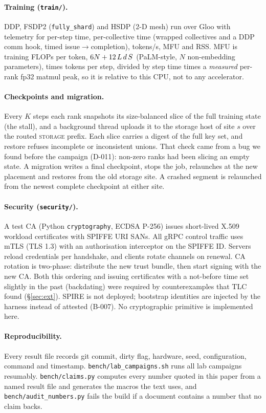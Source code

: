 \paragraph{Training (\texttt{train/}).}
DDP, FSDP2 (\texttt{fully\_shard}) and HSDP (2-D mesh) run over Gloo with telemetry for per-step time,
per-collective time (wrapped collectives and a DDP comm hook, timed issue$\to$completion), tokens/s, MFU and
RSS. MFU is training FLOPs per token, $6N + 12\,L\,d\,S$ (PaLM-style, $N$ non-embedding parameters), times tokens
per step, divided by step time times a \emph{measured} per-rank fp32 matmul peak, so it is relative to this CPU, not to
any accelerator.

\paragraph{Checkpoints and migration.}
Every $K$ steps each rank snapshots its size-balanced slice of the full training state (the stall), and a
background thread uploads it to the storage host of site $s$ over the routed \textsc{storage} prefix.
Each slice carries a digest of the full key set, and restore refuses incomplete or inconsistent unions.
That check came from a bug we found before the campaign (D-011): non-zero ranks had been slicing an
empty state. A migration writes a final checkpoint, stops the job, relaunches at the new placement and
restores from the old storage site. A crashed segment is relaunched from the newest complete checkpoint
at either site.

\paragraph{Security (\texttt{security/}).}
A test CA (Python \texttt{cryptography}, ECDSA P-256) issues short-lived X.509 workload certificates with
SPIFFE URI SANs. All gRPC control traffic uses mTLS (TLS 1.3) with an authorisation interceptor on the
SPIFFE ID. Servers reload credentials per handshake, and clients rotate channels on renewal. CA rotation
is two-phase: distribute the new trust bundle, then start signing with the new CA. Both this ordering and
issuing certificates with a not-before time set slightly in the past (backdating) were required by
counterexamples that TLC found (\S\ref{sec:ext}). SPIRE is not deployed; bootstrap identities are injected
by the harness instead of attested (B-007). No cryptographic primitive is implemented here.

\paragraph{Reproducibility.}
Every result file records git commit, dirty flag, hardware, seed, configuration, command and timestamp.
\texttt{bench/lab\_campaigns.sh} runs all lab campaigns resumably. \texttt{bench/claims.py} computes every
number quoted in this paper from a named result file and generates the macros the text uses, and
\texttt{bench/audit\_numbers.py} fails the build if a document contains a number that no claim backs.
